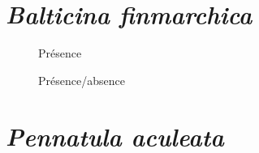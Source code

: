 \documentclass[
  letterpaper,
  DIV=11,
  numbers=noendperiod]{scrreprt}
\begin{document}
\hypertarget{balticina-finmarchica}{%
\section*{\texorpdfstring{\emph{Balticina
finmarchica}}{Balticina finmarchica}}\label{balticina-finmarchica}}


\begin{figure}

\begin{minipage}[t]{\linewidth}

{\centering 


\caption{Présence}

}

\end{minipage}%
\newline
\begin{minipage}[t]{\linewidth}

{\centering 


\caption{Présence/absence}

}

\end{minipage}%

\end{figure}

\hypertarget{pennatula-aculeata}{%
\section*{\texorpdfstring{\emph{Pennatula
aculeata}}{Pennatula aculeata}}\label{pennatula-aculeata}}

\end{document}

